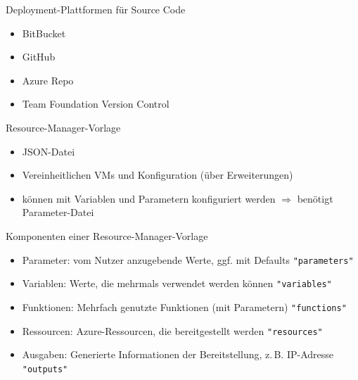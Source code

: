 
\begin{flashcard}[Definition]{Deployment-Plattformen für Source Code}
    \begin{itemize}
        \item BitBucket
        \item GitHub
        \item Azure Repo
        \item Team Foundation Version Control
    \end{itemize}
\end{flashcard}


\begin{flashcard}[Definition]{Resource-Manager-Vorlage}
    \begin{itemize}
        \item JSON-Datei
        \item Vereinheitlichen VMs und Konfiguration (über Erweiterungen)
        \item können mit Variablen und Parametern konfiguriert werden\newline
            $\Rightarrow$ benötigt Parameter-Datei
    \end{itemize}
\end{flashcard}

\begin{flashcard}[Definition]{Komponenten einer Resource-Manager-Vorlage}
    \begin{itemize}
        \item Parameter: vom Nutzer anzugebende Werte, ggf. mit Defaults\newline
            \texttt{"parameters"}
        \item Variablen: Werte, die mehrmals verwendet werden können\newline
            \texttt{"variables"}
        \item Funktionen: Mehrfach genutzte Funktionen (mit Parametern)\newline
            \texttt{"functions"}
        \item Ressourcen: Azure-Ressourcen, die bereitgestellt werden\newline
            \texttt{"resources"}
        \item Ausgaben: Generierte Informationen der Bereitstellung, z.\,B. IP-Adresse\newline
            \texttt{"outputs"}
    \end{itemize}
\end{flashcard}

